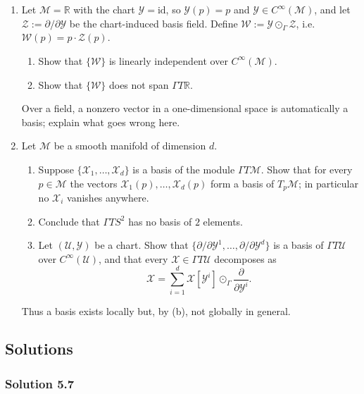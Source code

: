 \documentclass[11pt]{article}
\newcommand{\TpM}{T_p\mathcal M}
\newcommand{\Cinf}{C^\infty(\mathcal M)}
\begin{document}
\begin{enumerate}[label=\textbf{5.\arabic*}, leftmargin=2.2cm, start=7]
\item \label{prob:independent-not-spanning}
Let $\mathcal M=\mathbb R$ with the chart $\mathcal Y=\mathrm{id}$, so
$\mathcal Y(p)=p$ and $\mathcal Y\in\Cinf$, and let $\mathcal
Z:=\partial/\partial\mathcal Y$ be the chart-induced basis field. Define
$\mathcal W:=\mathcal Y\odot_\Gamma\mathcal Z$, i.e.\ $\mathcal
W(p)=p\cdot\mathcal Z(p)$.
\begin{enumerate}[label=(\alph*)]
  \item Show that $\{\mathcal W\}$ is linearly independent over $\Cinf$.
  \item Show that $\{\mathcal W\}$ does not span $\Gamma T\mathbb R$.
\end{enumerate}
Over a field, a nonzero vector in a one-dimensional space is automatically
a basis; explain what goes wrong here.

\item \label{prob:no-global-basis}
Let $\mathcal M$ be a smooth manifold of dimension $d$.
\begin{enumerate}[label=(\alph*)]
  \item Suppose $\{\mathcal X_1,\dots,\mathcal X_d\}$ is a basis of the
  module $\Gamma T\mathcal M$. Show that for every $p\in\mathcal M$ the
  vectors $\mathcal X_1(p),\dots,\mathcal X_d(p)$ form a basis of $\TpM$; in
  particular no $\mathcal X_i$ vanishes anywhere.
  \item Conclude that $\Gamma TS^2$ has no basis of $2$ elements.
  \item Let $(\mathcal U,\mathcal Y)$ be a chart. Show that
  $\{\partial/\partial\mathcal Y^1,\dots,\partial/\partial\mathcal Y^d\}$ is
  a basis of $\Gamma T\mathcal U$ over $C^\infty(\mathcal U)$, and that
  every $\mathcal X\in\Gamma T\mathcal U$ decomposes as
  \[
  \mathcal X=\sum_{i=1}^d\mathcal X[\mathcal Y^i]\odot_\Gamma\frac{\partial}{\partial\mathcal Y^i}.
  \]
\end{enumerate}
Thus a basis exists locally but, by (b), not globally in general.

\end{enumerate}

\subsection*{Solutions}

\subsubsection*{Solution 5.7}
\end{document}
